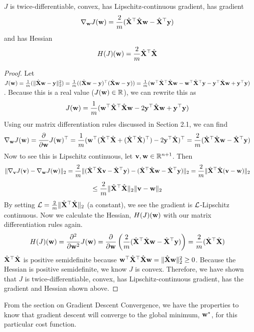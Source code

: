\begin{proposition}
$J$ is twice-differentiable, convex, has Lipschitz-continuous gradient, has gradient
$$\nabla_{\vw} J(\vw) = \frac{2}{m} (\hat{\MX}^\top \hat{\MX} \vw - \hat{\MX} ^\top \vy)$$
and has Hessian
$$ H(J)(\vw) = \frac{2}{m} \hat{\MX} ^\top \hat{\MX} $$
\begin{proof}
Let $J(\vw)
= \frac{1}{m} (\lVert \hat{\MX} \vw - \vy \rVert_2^2)
= \frac{1}{m} ((\hat{\MX} \vw - \vy)^\top (\hat{\MX} \vw - \vy))
= \frac{1}{m} (\vw^\top \hat{\MX}^\top \hat{\MX} \vw - \vw^\top \hat{\MX}^\top \vy - \vy^\top \hat{\MX} \vw + \vy^\top \vy)$. Because this is a real value ($J(\vw) \in \R$), we can rewrite this as
$$ J(\vw) = \frac{1}{m} (\vw^\top \hat{\MX}^\top \hat{\MX} \vw - 2 \vy^\top \hat{\MX} \vw + \vy^\top \vy) $$
Using our matrix differentiation rules discussed in Section 2.1, we can find
$$ \nabla_\vw J(\vw) = \frac{\partial}{\partial \vw} J(\vw)^\top
= \frac{1}{m}(\vw^\top (\hat{\MX} ^\top \hat{\MX} + (\hat{\MX} ^\top \hat{\MX})^\top) - 2 \vy^\top \hat{\MX})^\top
= \frac{2}{m} (\hat{\MX} ^\top \hat{\MX} \vw - \hat{\MX}^\top \vy) $$
Now to see this is Lipschitz continuous, let $\vv, \vw \in \R^{n+1}$. Then
$$ \lVert \nabla_\vv J(\vv) - \nabla_\vw J(\vw) \rVert_2
= \frac{2}{m} \lVert (\hat{\MX} ^\top \hat{\MX} \vv - \hat{\MX}^\top \vy) - (\hat{\MX} ^\top \hat{\MX} \vw - \hat{\MX}^\top \vy) \rVert_2
= \frac{2}{m} \lVert \hat{\MX} ^\top \hat{\MX} (\vv - \vw) \rVert_2$$
$$\leq \frac{2}{m} \lVert \hat{\MX} ^\top \hat{\MX} \rVert_2 \lVert \vv - \vw \rVert_2$$
By setting $\Lip = \frac{2}{m} \lVert \hat{\MX} ^\top \hat{\MX} \rVert_2$ (a constant), we see the gradient is $\Lip$-Lipschitz continuous. Now we calculate the Hessian, $H(J)(\vw)$ with our matrix differentiation rules again.
$$ H(J)(\vw)
= \frac{\partial^2}{\partial \vw^2} J(\vw)
= \frac{\partial}{\partial \vw} \left( \frac{2}{m} (\hat{\MX} ^\top \hat{\MX} \vw - \hat{\MX}^\top \vy) \right)
= \frac{2}{m} (\hat{\MX} ^\top \hat{\MX})$$
$\hat{\MX} ^\top \hat{\MX}$ is positive semidefinite because $\vw^\top \hat{\MX} ^\top \hat{\MX} \vw = \lVert \hat{\MX} \vw \rVert_2^2 \geq 0$. Because the Hessian is positive semidefinite, we know $J$ is convex. Therefore, we have shown that $J$ is twice-differentiable, convex, has Lipschitz-continuous gradient, has the gradient and Hessian shown above.
\end{proof}
\end{proposition}
From the section on Gradient Descent Convergence, we have the properties to know that gradient descent will converge to the global minimum, $\vw^\ast$, for this particular cost function.

